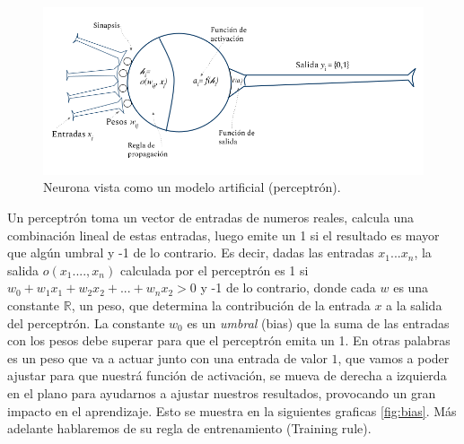 \begin{figure}[h]
 \centering
 \includegraphics[scale=0.5]{../Figuras/Percp.png}
 \caption{Neurona vista como un modelo artificial (perceptrón).}
 \label{fig:unaNeurona}
\end{figure}


Un perceptrón toma un vector de entradas de numeros reales, calcula una combinación lineal de estas entradas, luego emite un 1 si el resultado es mayor que algún umbral y -1 de lo contrario. 
Es decir, dadas las entradas $x_{1}... x_{n}$, la salida $o(x_{1}. ..., x_{n})$ calculada por el perceptrón es 1 si $w_{0} + w_{1}x_{1} + w_{2}x_{2} + ... + w_{n}x_{2} > 0 $ y -1 de lo contrario, donde cada $w$ es una constante $\mathbb{R}$, un peso, que determina la contribución de la entrada $x$ a la salida del perceptrón.  La constante $w_{0}$ es un \emph{umbral} (bias) que la suma de las entradas con los pesos debe superar para que el perceptrón emita un 1. En otras palabras es un peso que va a actuar junto con una entrada de valor $1$, que vamos a poder ajustar para que nuestrá función de activación, se mueva de derecha a izquierda en el plano para ayudarnos a ajustar nuestros resultados, provocando un gran impacto en el aprendizaje. Esto se muestra en la siguientes graficas \ref{fig:bias}. Más adelante hablaremos de su regla de entrenamiento (Training rule).

